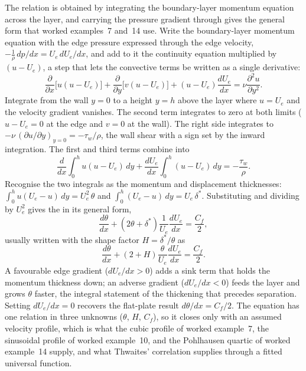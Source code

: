  The relation is obtained by
integrating the boundary-layer momentum equation across the layer, and
carrying the pressure gradient through gives the general form that
worked examples~7 and~14 use. Write the boundary-layer momentum
equation with the edge pressure expressed through the edge velocity,
$-\tfrac1\rho\,dp/dx = U_e\,dU_e/dx$, and add to it the continuity
equation multiplied by $(u - U_e)$, a step that lets the convective
terms be written as a single derivative:
\[
\frac{\partial}{\partial x}\big[u(u - U_e)\big] +
\frac{\partial}{\partial y}\big[v(u - U_e)\big] +
(u - U_e)\frac{dU_e}{dx} = \nu\frac{\partial^2 u}{\partial y^2}.
\]
Integrate from the wall $y = 0$ to a height $y = h$ above the layer
where $u = U_e$ and the velocity gradient vanishes. The second term
integrates to zero at both limits ($u - U_e = 0$ at the edge and
$v = 0$ at the wall). The right side integrates to $-\nu\,(\partial
u/\partial y)_{y=0} = -\tau_w/\rho$, the wall shear with a sign set by
the inward integration. The first and third terms combine into
\[
\frac{d}{dx}\int_0^h u(u - U_e)\,dy + \frac{dU_e}{dx}\int_0^h
(u - U_e)\,dy = -\frac{\tau_w}{\rho}.
\]
Recognise the two integrals as the momentum and displacement
thicknesses: $\int_0^h u(U_e - u)\,dy = U_e^2\,\theta$ and $\int_0^h
(U_e - u)\,dy = U_e\,\delta^*$. Substituting and dividing by $U_e^2$
gives the  in its general
form,
\[
\frac{d\theta}{dx} + (2\theta + \delta^*)\frac{1}{U_e}\frac{dU_e}{dx}
= \frac{C_f}{2},
\]
usually written with the shape factor $H = \delta^*/\theta$ as
\[
\frac{d\theta}{dx} + (2 + H)\frac{\theta}{U_e}\frac{dU_e}{dx} =
\frac{C_f}{2}.
\]
A favourable edge gradient ($dU_e/dx > 0$) adds a sink term that holds
the momentum thickness down; an adverse gradient ($dU_e/dx < 0$) feeds
the layer and grows $\theta$ faster, the integral statement of the
thickening that precedes separation. Setting $dU_e/dx = 0$ recovers the
flat-plate result $d\theta/dx = C_f/2$. The equation has one relation
in three unknowns ($\theta$, $H$, $C_f$), so it closes only with an
assumed velocity profile, which is what the cubic profile of worked
example~7, the sinusoidal profile of worked example~10, and the
Pohlhausen quartic of worked example~14 supply, and what Thwaites'
correlation supplies through a fitted universal function.

